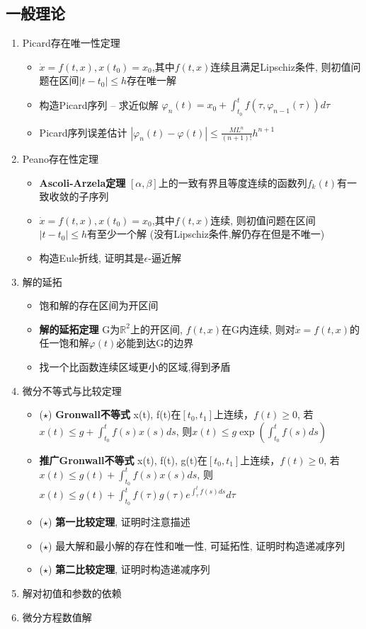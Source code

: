 \subsection{一般理论}
\begin{enumerate}
    \item Picard存在唯一性定理
    \begin{itemize}
        \item $\dot{x}=f(t,x), x(t_0)=x_0$,其中$f(t,x)$连续且满足Lipschiz条件,
        则初值问题在区间$|t-t_0|\leq h$存在唯一解
        \item 构造Picard序列 -- 求近似解 $\varphi_{n}(t) = x_0 + \int_{t_0}^{t}f(\tau , \varphi_{n-1}(\tau))d\tau$
        \item Picard序列误差估计 $|\varphi_{n}(t) - \varphi(t)| \leq \frac{ML^{n}}{(n+1)!}h^{n+1}$
    \end{itemize}
    \item Peano存在性定理
    \begin{itemize}
        \item \textbf{Ascoli-Arzela定理} $[\alpha, \beta]$上的一致有界且等度连续的函数列${f_k(t)}$有一致收敛的子序列
        \item $\dot{x}=f(t,x), x(t_0)=x_0$,其中$f(t,x)$连续,
        则初值问题在区间$|t-t_0|\leq h$有至少一个解 (没有Lipschiz条件,解仍存在但是不唯一)
        \item 构造Eule折线, 证明其是$\epsilon$-逼近解
    \end{itemize}
    \item 解的延拓
    \begin{itemize}
        \item 饱和解的存在区间为开区间
        \item \textbf{解的延拓定理} G为$\mathbb{R}^2$上的开区间, $f(t,x)$在G内连续,
        则对$\dot{x}=f(t,x)$的任一饱和解$\varphi(t)$必能到达G的边界
        \item 找一个比函数连续区域更小的区域,得到矛盾
    \end{itemize}
    \item 微分不等式与比较定理
    \begin{itemize}
        \item ($\star$) \textbf{Gronwall不等式} x(t), f(t)在$[t_0, t_1]$上连续，$f(t)\geq 0$, 若$x(t)\leq g + \int_{t_0}^{t}f(s)x(s)ds$, 则$x(t)\leq g\exp(\int_{t_0}^{t}f(s)ds)$
        \item \textbf{推广Gronwall不等式} x(t), f(t), g(t)在$[t_0, t_1]$上连续，$f(t)\geq 0$, 若$x(t)\leq g(t) + \int_{t_0}^{t}f(s)x(s)ds$, 则$x(t)\leq g(t) + \int_{t_0}^{t}f(\tau)g(\tau)e^{\int_{\tau}^{t}f(s)ds}d\tau$
        \item ($\star$) \textbf{第一比较定理}, 证明时注意描述
        \item ($\star$) 最大解和最小解的存在性和唯一性, 可延拓性, 证明时构造递减序列
        \item ($\star$) \textbf{第二比较定理}, 证明时构造递减序列
    \end{itemize}
    \item 解对初值和参数的依赖
    \item 微分方程数值解
\end{enumerate}
